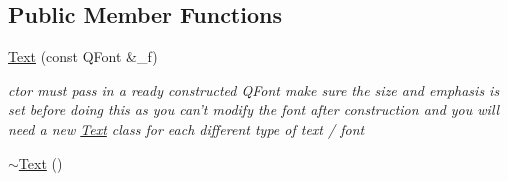 \subsection*{Public Member Functions}
\begin{DoxyCompactItemize}
\item 
\hyperlink{class_text_a71c71bad833eccb26357945fc10fd085}{Text} (const Q\-Font \&\-\_\-f)
\begin{DoxyCompactList}\small\item\em ctor must pass in a ready constructed Q\-Font make sure the size and emphasis is set before doing this as you can't modify the font after construction and you will need a new \hyperlink{class_text}{Text} class for each different type of text / font \end{DoxyCompactList}\item 
\hypertarget{class_text_a2d49e5c280e205125b149f7777ae30c7}{\hyperlink{class_text_a2d49e5c280e205125b149f7777ae30c7}{$\sim$\-Text} ()}\label{class_text_a2d49e5c280e205125b149f7777ae30c7}


\end{DoxyCompactItemize}
